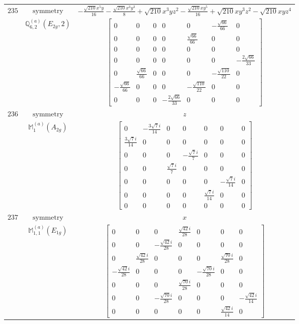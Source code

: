 \documentclass[fleqn,8pt,landscape]{jsarticle}
\begin{document}
\begin{longtable}{ccc}
$ 235 $ & $ \text{symmetry} $ & $ - \frac{\sqrt{210} x^{5} y}{16} - \frac{\sqrt{210} x^{3} y^{3}}{8} + \sqrt{210} x^{3} y z^{2} - \frac{\sqrt{210} x y^{5}}{16} + \sqrt{210} x y^{3} z^{2} - \sqrt{210} x y z^{4} $ \\
$  $ & $ \mathbb{Q}_{6,2}^{(a)}(E_{2g},2) $ & $ \begin{bmatrix} 0 & 0 & 0 & 0 & 0 & - \frac{\sqrt{66}}{66} & 0 \\ 0 & 0 & 0 & 0 & \frac{\sqrt{66}}{66} & 0 & 0 \\ 0 & 0 & 0 & 0 & 0 & 0 & 0 \\ 0 & 0 & 0 & 0 & 0 & 0 & - \frac{2 \sqrt{66}}{33} \\ 0 & \frac{\sqrt{66}}{66} & 0 & 0 & 0 & - \frac{\sqrt{110}}{22} & 0 \\ - \frac{\sqrt{66}}{66} & 0 & 0 & 0 & - \frac{\sqrt{110}}{22} & 0 & 0 \\ 0 & 0 & 0 & - \frac{2 \sqrt{66}}{33} & 0 & 0 & 0 \end{bmatrix} $ \\ \hline
$ 236 $ & $ \text{symmetry} $ & $ z $ \\
$  $ & $ \mathbb{M}_{1}^{(a)}(A_{2g}) $ & $ \begin{bmatrix} 0 & - \frac{3 \sqrt{7} i}{14} & 0 & 0 & 0 & 0 & 0 \\ \frac{3 \sqrt{7} i}{14} & 0 & 0 & 0 & 0 & 0 & 0 \\ 0 & 0 & 0 & - \frac{\sqrt{7} i}{7} & 0 & 0 & 0 \\ 0 & 0 & \frac{\sqrt{7} i}{7} & 0 & 0 & 0 & 0 \\ 0 & 0 & 0 & 0 & 0 & - \frac{\sqrt{7} i}{14} & 0 \\ 0 & 0 & 0 & 0 & \frac{\sqrt{7} i}{14} & 0 & 0 \\ 0 & 0 & 0 & 0 & 0 & 0 & 0 \end{bmatrix} $ \\ \hline
$ 237 $ & $ \text{symmetry} $ & $ x $ \\
$  $ & $ \mathbb{M}_{1,1}^{(a)}(E_{1g}) $ & $ \begin{bmatrix} 0 & 0 & 0 & \frac{\sqrt{42} i}{28} & 0 & 0 & 0 \\ 0 & 0 & - \frac{\sqrt{42} i}{28} & 0 & 0 & 0 & 0 \\ 0 & \frac{\sqrt{42} i}{28} & 0 & 0 & 0 & \frac{\sqrt{70} i}{28} & 0 \\ - \frac{\sqrt{42} i}{28} & 0 & 0 & 0 & - \frac{\sqrt{70} i}{28} & 0 & 0 \\ 0 & 0 & 0 & \frac{\sqrt{70} i}{28} & 0 & 0 & 0 \\ 0 & 0 & - \frac{\sqrt{70} i}{28} & 0 & 0 & 0 & - \frac{\sqrt{42} i}{14} \\ 0 & 0 & 0 & 0 & 0 & \frac{\sqrt{42} i}{14} & 0 \end{bmatrix} $ \\ \hline

\end{longtable}
\end{document}
